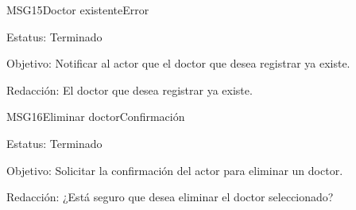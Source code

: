 \begin{mensaje}{MSG15}{Doctor existente}{Error}
	\item[Estatus:] Terminado
	\item[Objetivo:] Notificar al actor que el doctor que desea registrar ya existe.
	\item[Redacción:] El doctor que desea registrar ya existe.
\end{mensaje}

\begin{mensaje}{MSG16}{Eliminar doctor}{Confirmación}
	\item[Estatus:] Terminado
	\item[Objetivo:] Solicitar la confirmación del actor para eliminar un doctor.
	\item[Redacción:] ¿Está seguro que desea eliminar el doctor seleccionado?
\end{mensaje}

